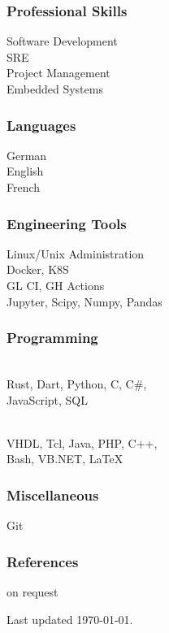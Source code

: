 \begin{facts}
    \subsubsection{Professional Skills}
    Software Development\\
    SRE\\
    Project Management\\
    Embedded Systems
    \sectionsep
    
    \subsubsection{Languages}
    German \\
    English \\
    French 
    \sectionsep
    
    \subsubsection{Engineering Tools}
    Linux/Unix Administration\\
    Docker, K8S\\
    GL CI, GH Actions\\
    Jupyter, Scipy, Numpy, Pandas
    \sectionsep
    
    \subsubsection{Programming}
    \\
    Rust, Dart, Python, C, C\#,\\
    JavaScript, SQL
    \sectionsep
    
    \\
    VHDL, Tcl, Java, PHP, C++,\\
    Bash, VB.NET, LaTeX
    \sectionsep
    
    \subsubsection{Miscellaneous}
    Git
    \sectionsep
    
    \subsubsection{References}
    on request
    
    \sectionsep
    Last updated \today.
    
    \end{facts}%
